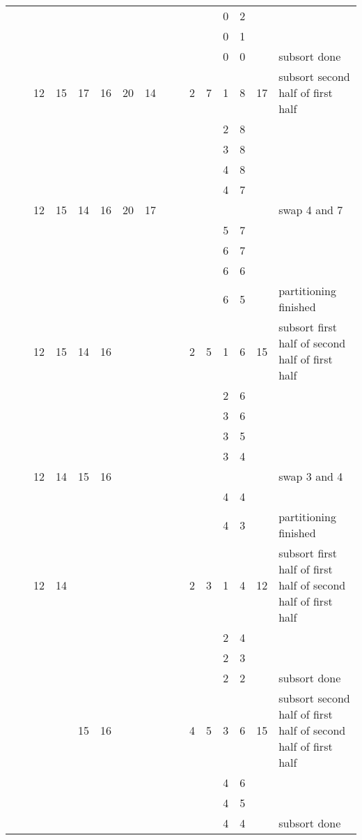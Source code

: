 \documentclass[
]{article}
\begin{document}
\begin{longtable}[]{@{}llllllllllllllll@{}}
& & & & & & & & & & & & 0 & 2 & & \\
& & & & & & & & & & & & 0 & 1 & & \\
& & & & & & & & & & & & 0 & 0 & & subsort done \\
& & 12 & 15 & 17 & 16 & 20 & 14 & & & 2 & 7 & 1 & 8 & 17 & subsort
second half of first half \\
& & & & & & & & & & & & 2 & 8 & & \\
& & & & & & & & & & & & 3 & 8 & & \\
& & & & & & & & & & & & 4 & 8 & & \\
& & & & & & & & & & & & 4 & 7 & & \\
& & 12 & 15 & 14 & 16 & 20 & 17 & & & & & & & & swap 4 and 7 \\
& & & & & & & & & & & & 5 & 7 & & \\
& & & & & & & & & & & & 6 & 7 & & \\
& & & & & & & & & & & & 6 & 6 & & \\
& & & & & & & & & & & & 6 & 5 & & partitioning finished \\
& & 12 & 15 & 14 & 16 & & & & & 2 & 5 & 1 & 6 & 15 & subsort first half
of second half of first half \\
& & & & & & & & & & & & 2 & 6 & & \\
& & & & & & & & & & & & 3 & 6 & & \\
& & & & & & & & & & & & 3 & 5 & & \\
& & & & & & & & & & & & 3 & 4 & & \\
& & 12 & 14 & 15 & 16 & & & & & & & & & & swap 3 and 4 \\
& & & & & & & & & & & & 4 & 4 & & \\
& & & & & & & & & & & & 4 & 3 & & partitioning finished \\
& & 12 & 14 & & & & & & & 2 & 3 & 1 & 4 & 12 & subsort first half of
first half of second half of first half \\
& & & & & & & & & & & & 2 & 4 & & \\
& & & & & & & & & & & & 2 & 3 & & \\
& & & & & & & & & & & & 2 & 2 & & subsort done \\
& & & & 15 & 16 & & & & & 4 & 5 & 3 & 6 & 15 & subsort second half of
first half of second half of first half \\
& & & & & & & & & & & & 4 & 6 & & \\
& & & & & & & & & & & & 4 & 5 & & \\
& & & & & & & & & & & & 4 & 4 & & subsort done \\

\end{longtable}
\end{document}

